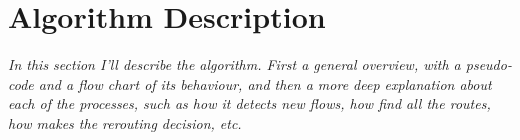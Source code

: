 \chapter{Algorithm Description}
\label{ch:algorithm}

\textit{ {\color{red} In this section I'll describe the algorithm. First a general overview, with a pseudo-code and a flow chart of its behaviour, and then a more deep explanation about each of the processes, such as how it detects new flows, how find all the routes,  how makes the rerouting decision, etc. } }

%




